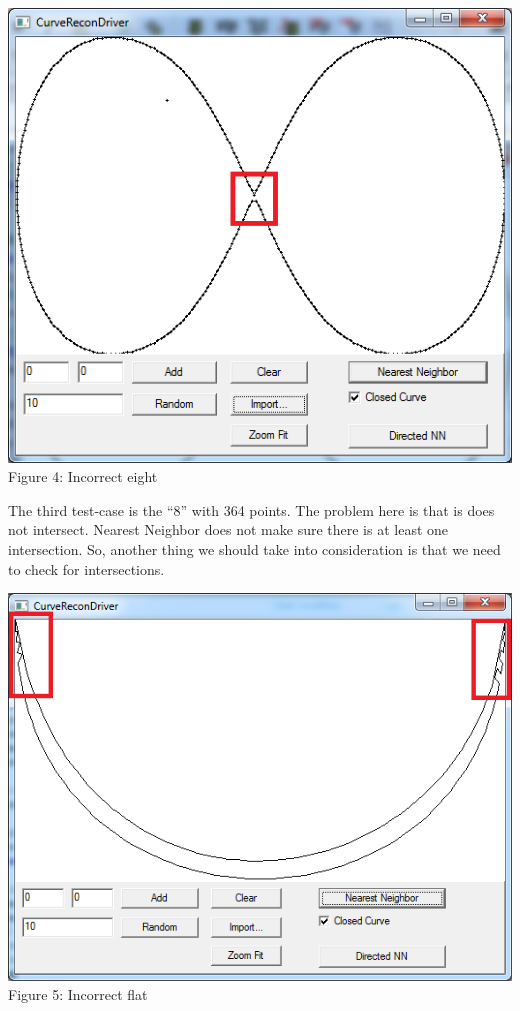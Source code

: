     \begin{center}
      \includegraphics[scale = 0.6]{1NearestNeighbor/nnEightgraph.png}\\
      Figure 4: Incorrect eight
    \end{center}

    \noindent The third test-case is the ``8'' with 364 points. The problem here is that is does not intersect. Nearest Neighbor does not make sure there is at least one intersection. So, another thing we should take into consideration is that we need to check for intersections. \\

    \begin{center}
      \includegraphics[scale = 0.6]{1NearestNeighbor/nnFlatgraph.png}\\
      Figure 5: Incorrect flat
    \end{center}

